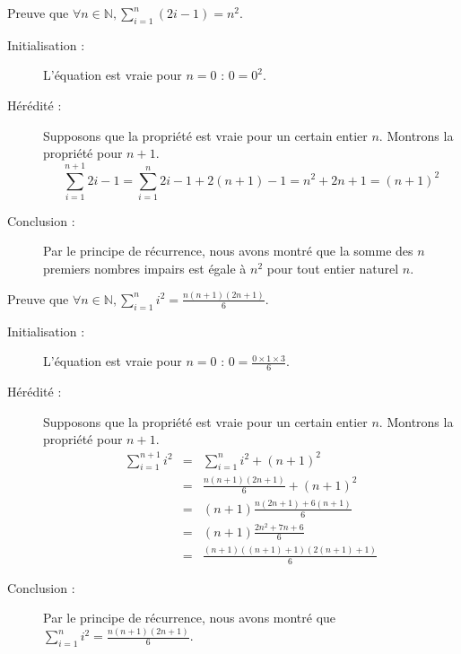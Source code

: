 \begin{corrections}

  \begin{questions}

  \item Preuve que $\forall n\in \mathbb{N}, \sum_{i=1}^n (2i-1) = n^2$.
    \begin{description}
    \item[Initialisation :] L'équation est vraie pour $n = 0$ : $0 = 0^2$.  
    \item[Hérédité :] Supposons que la propriété est vraie pour un certain entier $n$. Montrons la propriété pour $n+1$. 
      $$\sum_{i=1}^{n+1} 2i-1 = \sum_{i=1}^{n} 2i-1 + 2(n+1)-1 = n^2  + 2n + 1 = (n+1)^2$$
    \item[Conclusion :] Par le principe de récurrence, nous avons montré que la somme des $n$ premiers nombres impairs est égale à $n^2$ pour tout entier naturel $n$.
    \end{description}

  \item Preuve que $\forall n\in \mathbb{N}, \sum_{i=1}^n i^2 = \frac{n(n+1)(2n+1)}{6}$.
    \begin{description}
    \item[Initialisation :] L'équation est vraie pour $n = 0$ : $0 = \frac{0\times 1\times 3}{6}$.
    \item[Hérédité :] Supposons que la propriété est vraie pour un certain entier $n$. Montrons la propriété pour $n+1$. 
      $$\begin{array}{rcl}
      \sum_{i=1}^{n+1} i^2 &=& \sum_{i=1}^{n} i^2 + (n+1)^2 \\
      &=& \frac{n(n+1)(2n+1)}{6} + (n+1)^2\\
      &=& (n+1) \frac{n(2n+1) + 6(n+1)}{6}\\
      &=& (n+1) \frac{2n^2 + 7n + 6}{6}\\
      &=& \frac{(n+1)((n+1)+1)(2(n+1)+1)}{6}
      \end{array}$$
    \item[Conclusion :] Par le principe de récurrence, nous avons montré que $\sum_{i=1}^n i^2 = \frac{n(n+1)(2n+1)}{6}$.
    \end{description}

  \end{questions}

\end{corrections}

\endgroup
\endinput
